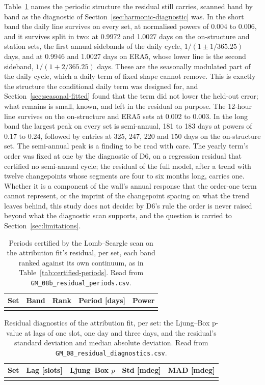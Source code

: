 \documentclass[11pt,a4paper]{article}
\begin{document}
Table~\ref{tab:residual-periods} names the periodic structure the residual
still carries, scanned band by band as the diagnostic of
Section~\ref{sec:harmonic-diagnostic} was. In the short band the daily line
survives on every set, at normalised powers of 0.004 to 0.006, and it
survives split in two: at 0.9972 and 1.0027 days on the on-structure and
station sets, the first annual sidebands of the daily cycle,
$1/(1 \pm 1/365.25)$ days, and at 0.9946 and 1.0027 days on ERA5, whose lower
line is the second sideband, $1/(1 + 2/365.25)$ days. These are the
seasonally modulated part of the daily cycle, which a daily term of fixed
shape cannot remove. This is exactly the structure the conditional daily term was
designed for, and Section~\ref{sec:seasonal-fitted} found that the term did
not lower the held-out error; what remains is small, known, and left in the
residual on purpose. The 12-hour line survives on the on-structure and ERA5
sets at 0.002 to 0.003. In the long band the largest peak on every set is
semi-annual, 181 to 183 days at powers of 0.17 to 0.24, followed by entries
at 325, 247, 220 and 150 days on the on-structure set. The semi-annual peak
is a finding to be read with care. The yearly term's order was fixed at one
by the diagnostic of D6, on a regression residual that certified no
semi-annual cycle; the residual of the full model, after a trend with twelve
changepoints whose segments are four to six months long, carries one.
Whether it is a component of the wall's annual response that the order-one
term cannot represent, or the imprint of the changepoint spacing on what
the trend leaves behind, this study does not decide: by D6's rule the order
is never raised beyond what the diagnostic scan supports, and the question
is carried to Section~\ref{sec:limitations}.

\begin{table}[H]
\centering
\caption{Periods certified by the Lomb--Scargle scan on the attribution
fit's residual, per set, each band ranked against its own continuum, as in
Table~\ref{tab:certified-periods}. Read from
\texttt{GM\_08b\_residual\_periods.csv}.}
\label{tab:residual-periods}
\begin{tabular}{llrrr}
\toprule
Set & Band & Rank & Period [days] & Power \\
\midrule
\\
\bottomrule
\end{tabular}
\end{table}

\begin{table}[H]
\centering
\caption{Residual diagnostics of the attribution fit, per set: the Ljung--Box
p-value at lags of one slot, one day and three days, and the residual's
standard deviation and median absolute deviation. Read from
\texttt{GM\_08\_residual\_diagnostics.csv}.}
\label{tab:residual}
\begin{tabular}{lrrrr}
\toprule
Set & Lag [slots] & Ljung--Box $p$ & Std [mdeg] & MAD [mdeg] \\
\midrule
\\
\bottomrule
\end{tabular}
\end{table}
\end{document}

